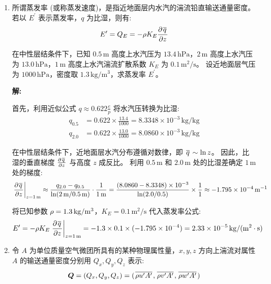 \begin{enumerate}
    \item 所谓蒸发率 (或称蒸发速度)，是指近地面层内水汽的湍流铅直输送通量密度。
    若以 $E^\prime$ 表示蒸发率，$q$ 为比湿，则有:
    \begin{equation*}
        E^\prime = Q_E = -\density K_E \pde{\mean{q}}{z}
    \end{equation*}

    在中性层结条件下，已知 $0.5\,\mathrm{m}$ 高度上水汽压为 $13.4\,\mathrm{hPa}$，$2\,\mathrm{m}$ 高度上水汽压为 $13.0\,\mathrm{hPa}$，$1\,\mathrm{m}$ 高度上水汽湍流扩散系数 $K_E$ 为 $0.1\,\mathrm{m^2/s}$。
    设近地面层气压为 $1000\,\mathrm{hPa}$，密度取 $1.3\,\mathrm{kg/m^3}$，求蒸发率 $E^\prime$。

    \vspace{1em}
    \textbf{解:}

    首先，利用近似公式 $q \approx 0.622 \frac{e}{p}$ 将水汽压转换为比湿:
    \begin{align*}
        q_{0.5} &= 0.622 \times \frac{13.4}{1000} = 8.3348 \times 10^{-3}\,\mathrm{kg/kg} \\
        q_{2.0} &= 0.622 \times \frac{13.0}{1000} = 8.0860 \times 10^{-3}\,\mathrm{kg/kg}
    \end{align*}

    在中性层结条件下，近地面层水汽分布遵循对数律，即 $\mkern2mu \overline{q} \mkern2mu \sim \ln z$。
    因此，比湿的垂直梯度 $\pde{\mean{q}}{z}$ 与高度 $z$ 成反比。
    利用 $0.5\,\mathrm{m}$ 和 $2.0\,\mathrm{m}$ 处的比湿差确定 $1\,\mathrm{m}$ 处的梯度:
    \begin{equation*}
        \left.\pde{\mean{q}}{z}\right|_{z = 1\,\mathrm{m}} \approx \frac{q_{2.0} - q_{0.5}}{\ln(2\,\mathrm{m}/0.5\,\mathrm{m})} \cdot \frac{1}{1\,\mathrm{m}} = \frac{(8.0860 - 8.3348) \times 10^{-3}}{\ln(2.0/0.5)} \times \frac{1}{1} \approx -1.795 \times 10^{-4}\,\mathrm{m^{-1}}
    \end{equation*}

    将已知参数 $\rho = 1.3\,\mathrm{kg/m^3}$，$K_E = 0.1\,\mathrm{m^2/s}$ 代入蒸发率公式:
    \begin{equation*}
        E^\prime = -\density K_E \left.\pde{\mean{q}}{z}\right|_{z = 1\,\mathrm{m}} = -1.3 \times 0.1 \times (-1.795 \times 10^{-4}) = 2.33 \times 10^{-5}\,\mathrm{kg/(m^2 \cdot s)}
    \end{equation*}

    \item 令 $A$ 为单位质量空气微团所具有的某种物理属性量，$x, y, z$ 方向上湍流对属性 $A$ 的输送通量密度分别用 $Q_x, Q_y, Q_z$ 表示:
    \begin{equation*}
        \bm{Q} = (Q_x, Q_y, Q_z) = (\mkern2mu \overline{\rho u' A'} \mkern2mu, \mkern2mu \overline{\rho v' A'} \mkern2mu, \mkern2mu \overline{\rho w' A'} \mkern2mu)
    \end{equation*}


\end{enumerate}

